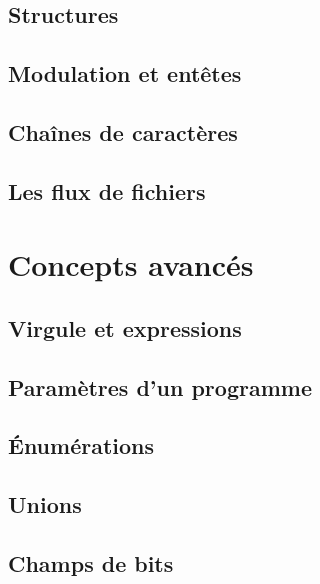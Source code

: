 \documentclass{minitelreport}
\begin{document}
\begin{refsection}
		\section{Structures}
			\label{sec:structures}
			
		\section{Modulation et entêtes}
			\label{sec:modulation_et_entetes}
			
		\section{Chaînes de caractères}
			\label{sec:chaines_caracteres}
			
		\section{Les flux de fichiers}
			\label{sec:flux_fichiers}
			
	\chapter{Concepts avancés}
	\label{chap:concepts_avances}
		\section{Virgule et expressions}
			\label{sec:virgule_et_expressions}
			
		\section{Paramètres d'un programme}
			\label{sec:parametres_programme}
			
		\section{Énumérations}
			\label{sec:enums}
			
		\section{Unions}
			\label{sec:unions}
			
		\section{Champs de bits}
			\label{sec:champs_de_bits}
			

\end{refsection}
\end{document}
